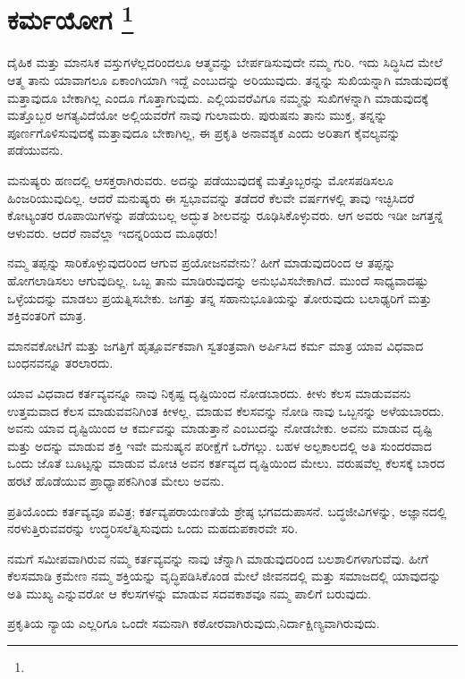 
\chapter[ಕರ್ಮಯೋಗ ]{ಕರ್ಮಯೋಗ \protect\footnote{}}

ದೈಹಿಕ ಮತ್ತು ಮಾನಸಿಕ ವಸ್ತುಗಳೆಲ್ಲದರಿಂದಲೂ ಆತ್ಮವನ್ನು ಬೇರ್ಪಡಿಸುವುದೇ ನಮ್ಮ ಗುರಿ. ಇದು ಸಿದ್ಧಿಸಿದ ಮೇಲೆ ಆತ್ಮ ತಾನು ಯಾವಾಗಲೂ ಏಕಾಂಗಿಯಾಗಿ ಇದ್ದೆ ಎಂಬುದನ್ನು ಅರಿಯುವುದು. ತನ್ನನ್ನು ಸುಖಿಯನ್ನಾಗಿ ಮಾಡುವುದಕ್ಕೆ ಮತ್ತಾವುದೂ ಬೇಕಾಗಿಲ್ಲ ಎಂದೂ ಗೊತ್ತಾಗುವುದು. ಎಲ್ಲಿಯವರೆವಿಗೂ ನಮ್ಮನ್ನು ಸುಖಿಗಳನ್ನಾಗಿ ಮಾಡುವುದಕ್ಕೆ ಮತ್ತೊಬ್ಬರ ಅಗತ್ಯವಿದೆಯೋ ಅಲ್ಲಿಯವರೆಗೆ ನಾವು ಗುಲಾಮರು. ಪುರುಷನು ತಾನು ಮುಕ್ತ, ತನ್ನನ್ನು ಪೂರ್ಣಗೊಳಿಸುವುದಕ್ಕೆ ಮತ್ತಾವುದೂ ಬೇಕಾಗಿಲ್ಲ, ಈ ಪ್ರಕೃತಿ ಅನಾವಶ್ಯಕ ಎಂದು ಅರಿತಾಗ ಕೈವಲ್ಯವನ್ನು ಪಡೆಯುವನು.

ಮನುಷ್ಯರು ಹಣದಲ್ಲಿ ಆಸಕ್ತರಾಗಿರುವರು. ಅದನ್ನು ಪಡೆಯುವುದಕ್ಕೆ ಮತ್ತೊಬ್ಬರನ್ನು ಮೋಸಪಡಿಸಲೂ ಹಿಂಜರಿಯುವುದಿಲ್ಲ. ಆದರೆ ಮನುಷ್ಯರು ಈ ಸ್ವಭಾವವನ್ನು ತಡೆದರೆ ಕೆಲವೇ ವರ್ಷಗಳಲ್ಲಿ ತಾವು ಇಚ್ಛಿಸಿದರೆ ಕೋಟ್ಯಂತರ ರೂಪಾಯಿಗಳನ್ನು ಪಡೆಯಬಲ್ಲ ಅದ್ಭುತ ಶೀಲವನ್ನು ರೂಢಿಸಿಕೊಳ್ಳುವರು. ಆಗ ಅವರು ಇಡೀ ಜಗತ್ತನ್ನೆ ಆಳುವರು. ಆದರೆ ನಾವೆಲ್ಲಾ ಇದನ್ನರಿಯದ ಮೂಢರು!

ನಮ್ಮ ತಪ್ಪನ್ನು ಸಾರಿಕೊಳ್ಳುವುದರಿಂದ ಆಗುವ ಪ್ರಯೋಜನವೇನು? ಹೀಗೆ ಮಾಡುವುದರಿಂದ ಆ ತಪ್ಪನ್ನು ಹೋಗಲಾಡಿಸಲು ಆಗುವುದಿಲ್ಲ. ಒಬ್ಬ ತಾನು ಮಾಡಿರುವುದನ್ನು ಅನುಭವಿಸಬೇಕಾಗಿದೆ. ಮುಂದೆ ಸಾಧ್ಯವಾದಷ್ಟು ಒಳ್ಳೆಯದನ್ನು ಮಾಡಲು ಪ್ರಯತ್ನಿಸಬೇಕು. ಜಗತ್ತು ತನ್ನ ಸಹಾನುಭೂತಿಯನ್ನು ತೋರುವುದು ಬಲಾಢ್ಯರಿಗೆ ಮತ್ತು ಶಕ್ತಿವಂತರಿಗೆ ಮಾತ್ರ.

ಮಾನವಕೋಟಿಗೆ ಮತ್ತು ಜಗತ್ತಿಗೆ ಹೃತ್ಪೂರ್ವಕವಾಗಿ ಸ್ವತಂತ್ರವಾಗಿ ಅರ್ಪಿಸಿದ ಕರ್ಮ ಮಾತ್ರ ಯಾವ ವಿಧವಾದ ಬಂಧನವನ್ನೂ ತರಲಾರದು.

ಯಾವ ವಿಧವಾದ ಕರ್ತವ್ಯವನ್ನೂ ನಾವು ನಿಕೃಷ್ಟ ದೃಷ್ಟಿಯಿಂದ ನೋಡಬಾರದು. ಕೀಳು ಕೆಲಸ ಮಾಡುವವನು ಉತ್ತಮವಾದ ಕೆಲಸ ಮಾಡುವವನಿಗಿಂತ ಕೀಳಲ್ಲ. ಮಾಡುವ ಕೆಲಸವನ್ನು ನೋಡಿ ನಾವು ಒಬ್ಬನನ್ನು ಅಳೆಯಬಾರದು. ಅವನು ಯಾವ ದೃಷ್ಟಿಯಿಂದ ಆ ಕರ್ಮವನ್ನು ಮಾಡುತ್ತಾನೆ ಎಂಬುದನ್ನು ನೋಡಬೇಕು. ಅವನು ಮಾಡುವ ದೃಷ್ಟಿ ಮತ್ತು ಅದನ್ನು ಮಾಡುವ ಶಕ್ತಿ ಇವೇ ಮನುಷ್ಯನ ಪರೀಕ್ಷೆಗೆ ಒರೆಗಲ್ಲು. ಬಹಳ ಅಲ್ಪಕಾಲದಲ್ಲಿ ಅತಿ ಸುಂದರವಾದ ಒಂದು ಜೊತೆ ಬೂಟ್ಸನ್ನು ಮಾಡುವ ಮೋಚಿ ಅವನ ಕರ್ತವ್ಯದ ದೃಷ್ಟಿಯಿಂದ ಮೇಲು. ವರುಷವೆಲ್ಲ ಕೆಲಸಕ್ಕೆ ಬಾರದ ಹರಟೆ ಹೊಡೆಯುವ ಪ್ರಾಧ್ಯಾಪಕನಿಗಿಂತ ಮೇಲು ಅವನು.

ಪ್ರತಿಯೊಂದು ಕರ್ತವ್ಯವೂ ಪವಿತ್ರ; ಕರ್ತವ್ಯಪರಾಯಣತೆಯೆ ಶ್ರೇಷ್ಠ ಭಗವದುಪಾಸನೆ. ಬದ್ಧಜೀವಿಗಳನ್ನು, ಅಜ್ಞಾನದಲ್ಲಿ ನರಳುತ್ತಿರುವವರನ್ನು ಉದ್ಧರಿಸಲೆತ್ನಿಸುವುದು ಒಂದು ಮಹದುಪಕಾರವೇ ಸರಿ.

ನಮಗೆ ಸಮೀಪವಾಗಿರುವ ನಮ್ಮ ಕರ್ತವ್ಯವನ್ನು ನಾವು ಚೆನ್ನಾಗಿ ಮಾಡುವುದರಿಂದ ಬಲಶಾಲಿಗಳಾಗುವೆವು. ಹೀಗೆ ಕೆಲಸಮಾಡಿ ಕ್ರಮೇಣ ನಮ್ಮ ಶಕ್ತಿಯನ್ನು ವೃದ್ಧಿಪಡಿಸಿಕೊಂಡ ಮೇಲೆ ಜೀವನದಲ್ಲಿ ಮತ್ತು ಸಮಾಜದಲ್ಲಿ ಯಾವುದನ್ನು ಅತಿ ಮುಖ್ಯ ಎನ್ನುವರೋ ಆ ಕೆಲಸಗಳನ್ನು ಮಾಡುವ ಸದವಕಾಶವೂ ನಮ್ಮ ಪಾಲಿಗೆ ಬರುವುದು.

ಪ್ರಕೃತಿಯ ನ್ಯಾಯ ಎಲ್ಲರಿಗೂ ಒಂದೇ ಸಮನಾಗಿ ಕಠೋರವಾಗಿರುವುದು,\break ನಿರ್ದಾಕ್ಷಿಣ್ಯವಾಗಿರುವುದು.

